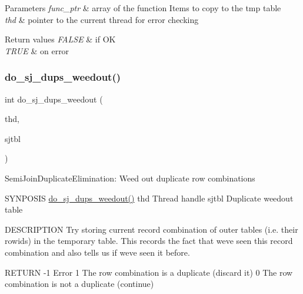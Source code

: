 \begin{DoxyParams}{Parameters}
{\em func\+\_\+ptr} & array of the function Items to copy to the tmp table \\
\hline
{\em thd} & pointer to the current thread for error checking \\
\hline
\end{DoxyParams}

\begin{DoxyRetVals}{Return values}
{\em F\+A\+L\+SE} & if OK \\
\hline
{\em T\+R\+UE} & on error ~\newline
 \\
\hline
\end{DoxyRetVals}
\mbox{\label{group__Query__Executor_ga4c3b77b483fa5b7bcefe0f38587480c8}} 
\subsubsection{\texorpdfstring{do\+\_\+sj\+\_\+dups\+\_\+weedout()}{do\_sj\_dups\_weedout()}}
{\footnotesize\ttfamily int do\+\_\+sj\+\_\+dups\+\_\+weedout (\begin{DoxyParamCaption}\item[{T\+HD $\ast$}]{thd,  }\item[{\mbox{\hyperlink{classSJ__TMP__TABLE}{S\+J\+\_\+\+T\+M\+P\+\_\+\+T\+A\+B\+LE}} $\ast$}]{sjtbl }\end{DoxyParamCaption})}

Semi\+Join\+Duplicate\+Elimination\+: Weed out duplicate row combinations

S\+Y\+N\+P\+O\+S\+IS \mbox{\hyperlink{group__Query__Executor_ga4c3b77b483fa5b7bcefe0f38587480c8}{do\+\_\+sj\+\_\+dups\+\_\+weedout()}} thd Thread handle sjtbl Duplicate weedout table

D\+E\+S\+C\+R\+I\+P\+T\+I\+ON Try storing current record combination of outer tables (i.\+e. their rowids) in the temporary table. This records the fact that we\textquotesingle{}ve seen this record combination and also tells us if we\textquotesingle{}ve seen it before.

R\+E\+T\+U\+RN -\/1 Error 1 The row combination is a duplicate (discard it) 0 The row combination is not a duplicate (continue) \mbox{\label{group__Query__Executor_ga1cbaa4a44140f41c161eaab87c25f473}} 
